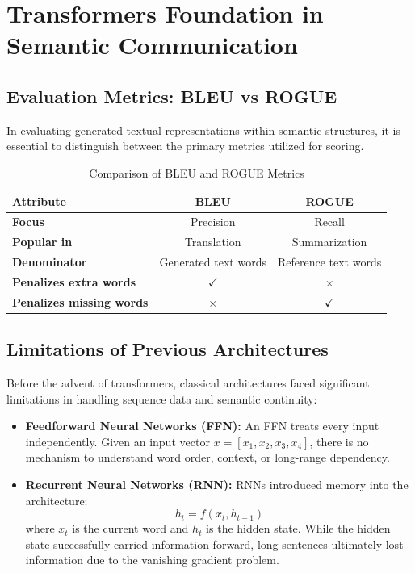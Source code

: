 \documentclass[10pt, conference]{IEEEtran}
\begin{document}
\section{\large \textbf{Transformers Foundation in Semantic Communication}}

\subsection{\textbf{Evaluation Metrics: BLEU vs ROGUE}}
In evaluating generated textual representations within semantic structures, it is essential to distinguish between the primary metrics utilized for scoring.

\begin{table}[h]
\centering
\caption{Comparison of BLEU and ROGUE Metrics}
\label{tab:bleu_vs_rogue}
\begin{tabular}{lcc}
\toprule
\textbf{Attribute} & \textbf{BLEU} & \textbf{ROGUE} \\
\midrule
\textbf{Focus} & Precision & Recall \\
\textbf{Popular in} & Translation & Summarization \\
\textbf{Denominator} & Generated text words & Reference text words \\
\textbf{Penalizes extra words} & $\checkmark$ & $\times$ \\
\textbf{Penalizes missing words} & $\times$ & $\checkmark$ \\
\bottomrule
\end{tabular}
\end{table}

\subsection{\textbf{Limitations of Previous Architectures}}
Before the advent of transformers, classical architectures faced significant limitations in handling sequence data and semantic continuity:
\begin{itemize}
    \item \textbf{Feedforward Neural Networks (FFN):} An FFN treats every input independently. Given an input vector $x = [x_1, x_2, x_3, x_4]$, there is no mechanism to understand word order, context, or long-range dependency.
    \item \textbf{Recurrent Neural Networks (RNN):} RNNs introduced memory into the architecture:
    \begin{equation}
        h_t = f(x_t, h_{t-1})
    \end{equation}
    where $x_t$ is the current word and $h_t$ is the hidden state. While the hidden state successfully carried information forward, long sentences ultimately lost information due to the vanishing gradient problem.
\end{itemize}
\end{document}
